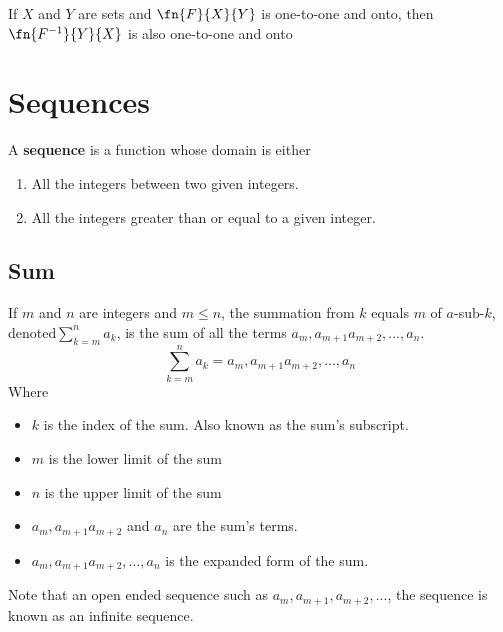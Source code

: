 \documentclass[11pt]{article}
\newcommand\inv{\ensuremath{^{-1}}}
\begin{document}
\begin{theorem}\label{def:inverse-fn-props}
    If $X$ and $Y$ are sets and $\fn{F}{X}{Y}$ is one-to-one and onto,
    then $\fn{F\inv}{Y}{X}$ is also one-to-one and onto
\end{theorem}

\section{Sequences}

\begin{definition}[Sequence]\label{def:sequence}
    A \textbf{sequence} is a function whose domain is either 
    \begin{enumerate}
        \item All the integers between two given integers.
        \item All the integers greater than or equal to a given integer.
    \end{enumerate}
    

    
\end{definition}

\subsection{Sum}

\begin{definition}[Sum]\label{def:sum}
    If $m$ and $n$ are integers and $m \leq n$, the summation
    from $k$ equals $m$ of $a$-sub-$k$, denoted$\sum_{k=m}^n a_k$,
    is the sum of all the terms $a_m, a_{m+1} a_{m+2}, ..., a_n$.
    \begin{equation*}
        \sum_{k=m}^n a_k = a_m, a_{m+1} a_{m+2}, ..., a_n
    \end{equation*}
    Where
    \begin{itemize}
        \item $k$ is the index of the sum. Also known as the sum's subscript.
        \item $m$ is the lower limit of the sum
        \item $n$ is the upper limit of the sum
        \item $a_m, a_{m+1} a_{m+2}$ and $a_n$ are the sum's terms.
        \item $a_m, a_{m+1} a_{m+2}, ..., a_n$ is the expanded form of the sum.
    \end{itemize}

    Note that an open ended sequence such as $a_m, a_{m+1}, a_{m+2}, ...$,
    the sequence is known as an infinite sequence.
\end{definition}
\end{document}

